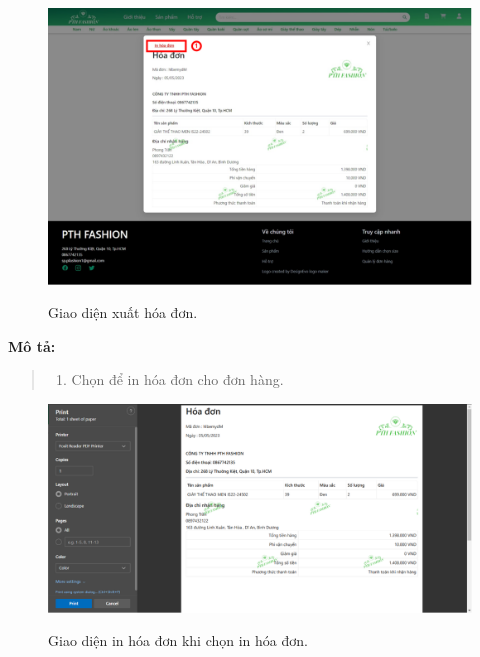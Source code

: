     \begin{figure}[!htp]
        \centering
        \includegraphics[width=5in]{img/UI/new_customer/invoice.png}
        \label{14}
        \newline
        \caption{Giao diện xuất hóa đơn.}
    \end{figure}
    \textbf{Mô tả:}  
    \begin{quote}
        \begin{enumerate}
            \item Chọn để in hóa đơn cho đơn hàng.
        \end{enumerate}
    \end{quote}  
    \begin{figure}[!htp]
        \centering
        \includegraphics[width=5in]{img/UI/new_customer/print_invoice.png}
        \label{14}
        \newline
        \caption{Giao diện in hóa đơn khi chọn in hóa đơn.}
    \end{figure}
   
    \newpage
       
